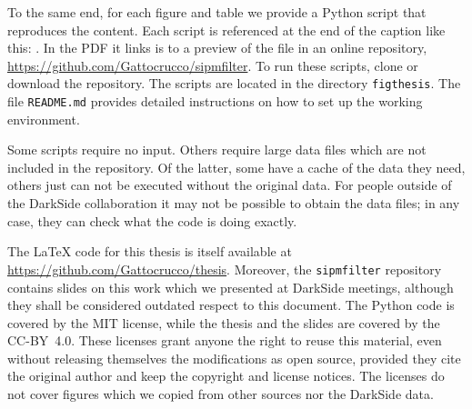 

To the same end, for each figure and table we provide a Python script that
reproduces the content. Each script is referenced at the end of the caption
like this: . In the PDF it links is to a preview of the
file in an online repository, \url{https://github.com/Gattocrucco/sipmfilter}.
To run these scripts, clone or download the repository. The scripts are located
in the directory \nolinkurl{figthesis}. The file \nolinkurl{README.md} provides
detailed instructions on how to set up the working environment.

Some scripts require no input. Others require large data files which are not
included in the repository. Of the latter, some have a cache of the data they
need, others just can not be executed without the original data. For people
outside of the DarkSide collaboration it may not be possible to obtain the data
files; in any case, they can check what the code is doing exactly.


The \LaTeX{} code for this thesis is itself available at
\url{https://github.com/Gattocrucco/thesis}. Moreover, the
\nolinkurl{sipmfilter} repository contains slides on this work which we
presented at DarkSide meetings, although they shall be considered outdated
respect to this document. The Python code is covered by the MIT license, while
the thesis and the slides are covered by the CC-BY~4.0. These licenses grant
anyone the right to reuse this material, even without releasing themselves the
modifications as open source, provided they cite the original author and keep
the copyright and license notices. The licenses do not cover figures which we
copied from other sources nor the DarkSide data.
